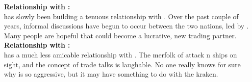 \documentclass[blue]{NeptuneBall}
\begin{document}
{\bf Relationship with \pAtlantis{}:}\\
\pAmerica{} has slowly been building a tenuous relationship with \pAtlantis{}. Over the past couple of years, informal discussions  have begun to occur between the two nations, led by \cAriel{\King} \cAriel{}. Many people are hopeful that \pAtlantis{} could become a lucrative, new trading partner.\\

{\bf Relationship with \pPacifica{}:}\\
 \pAmerica{} has a much less amicable relationship with \pPacifica{}. The merfolk of \pPacifica{} attack \pAmerica{}n ships on sight, and the concept of trade talks is laughable. No one really knows for sure why \pPacifica{} is so aggressive, but it may have something to do with the kraken.
\end{document}

